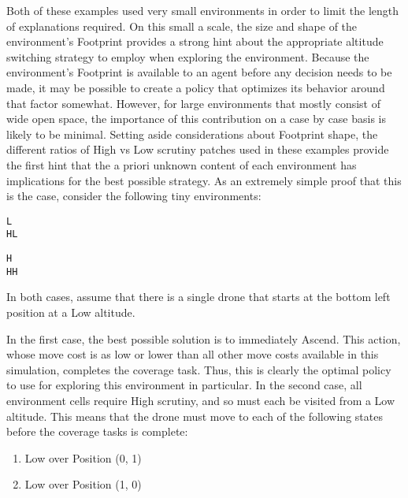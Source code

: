 Both of these examples used very small environments in order to limit the length of explanations required. On this small a scale, the size and shape of the environment's Footprint provides a strong hint about the appropriate altitude switching strategy to employ when exploring the environment. Because the environment's Footprint is available to an agent before any decision needs to be made, it may be possible to create a policy that optimizes its behavior around that factor somewhat. However, for large environments that mostly consist of wide open space, the importance of this contribution on a case by case basis is likely to be minimal. Setting aside considerations about Footprint shape, the different ratios of High vs Low scrutiny patches used in these examples provide the first hint that the a priori unknown content of each environment has implications for the best possible strategy. As an extremely simple proof that this is the case, consider the following tiny environments:

\begin{verbatim}
L 
HL
\end{verbatim}

\begin{verbatim}
H 
HH
\end{verbatim}

In both cases, assume that there is a single drone that starts at the bottom left position at a Low altitude.

In the first case, the best possible solution is to immediately Ascend. This action, whose move cost is as low or lower than all other move costs available in this simulation, completes the coverage task. Thus, this is clearly the optimal policy to use for exploring this environment in particular. In the second case, all environment cells require High scrutiny, and so must each be visited from a Low altitude. This means that the drone must move to each of the following states before the coverage tasks is complete:

\begin{enumerate}
	\item Low over Position (0, 1)
	\item Low over Position (1, 0)
\end{enumerate}

